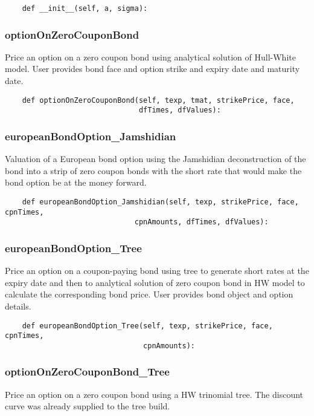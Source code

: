 \documentclass[twoside,11pt]{book}
\begin{document}
\begin{lstlisting}
    def __init__(self, a, sigma):
\end{lstlisting}

\subsubsection*{{\bf optionOnZeroCouponBond}}
Price an option on a zero coupon bond using analytical solution of Hull-White model. User provides bond face and option strike and expiry date and maturity date.  

\begin{lstlisting}
    def optionOnZeroCouponBond(self, texp, tmat, strikePrice, face,
                               dfTimes, dfValues):
\end{lstlisting}

\subsubsection*{{\bf europeanBondOption\_Jamshidian}}
Valuation of a European bond option using the Jamshidian deconstruction of the bond into a strip of zero coupon bonds with the short rate that would make the bond option be at the money forward.  

\begin{lstlisting}
    def europeanBondOption_Jamshidian(self, texp, strikePrice, face, cpnTimes,
                              cpnAmounts, dfTimes, dfValues):
\end{lstlisting}

\subsubsection*{{\bf europeanBondOption\_Tree}}
Price an option on a coupon-paying bond using tree to generate short rates at the expiry date and then to analytical solution of zero coupon bond in HW model to calculate the corresponding bond price. User provides bond object and option details.  

\begin{lstlisting}
    def europeanBondOption_Tree(self, texp, strikePrice, face, cpnTimes,
                                cpnAmounts):
\end{lstlisting}

\subsubsection*{{\bf optionOnZeroCouponBond\_Tree}}
Price an option on a zero coupon bond using a HW trinomial tree. The discount curve was already supplied to the tree build.  
\end{document}

